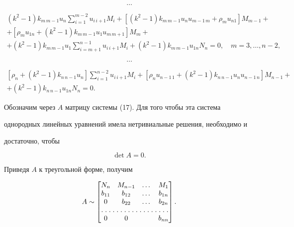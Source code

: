 $$


\dots


$$


\begin{multline}


(k^2-1)k_{m\,m-1}u_n\sum^{m-2}_{i=1}u_{i\,i+1}M_i+


[(k^2-1)k_{m\,m-1}u_nu_{m-1\,m}+\rho_mu_{n1}]M_{m-1}+\\


+[\rho_mu_{1n}+(k^2-1)k_{m\,m-1}u_1u_{m\,m+1}]M_m+\\


+(k^2-1)k_{m\,m-1}u_1\sum^{n-1}_{i=m+1}u_{i\,i+1}M_i+


(k^2-1)k_{m\,m-1}u_{1n}N_n=0,\quad m=3,\dotsc,n-2,


\tag{17.$m$}


\end{multline}


$$


\dots


$$


\begin{multline*}


[\rho_n+(k^2-1)k_{n\,n-1}u_n]\sum^{n-2}_{i=1}u_{i\,i+1}M_i+


[\rho_nu_{n-1\,1}+(k^2-1)k_{n\,n-1}u_nu_{n-1\,n}]M_{n-1}+\\


+(k^2-1)k_{n\,n-1}u_{1n}N_n=0.


\end{multline*}


\addtocounter{equation}{-1}





Обозначим через $A$ матрицу системы (17). Для того чтобы эта система


однородных линейных уравнений имела нетривиальные решения, необходимо и


достаточно, чтобы


\begin{equation}


\det A=0.


\end{equation}


Приведя $A$ к треугольной форме, получим


\begin{equation}


A\sim


\begin{bmatrix}


N_n & M_{n-1} & \dots & M_1\\


b_{11} & b_{12} & \dots & b_{1n}\\


0 & b_{22} & \dots & b_{2n} \\


\hdotsfor[1.5]{4}\\


0 & 0 & & b_{nn}


\end{bmatrix}


.


\end{equation}


